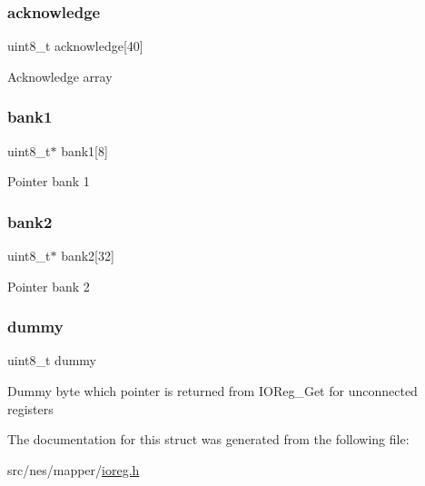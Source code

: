 \subsubsection{\texorpdfstring{acknowledge}{acknowledge}}
{\footnotesize\ttfamily uint8\+\_\+t acknowledge\mbox{[}40\mbox{]}}

Acknowledge array \mbox{\label{struct_i_o_reg_a3a254f17251e937f76932c5081eab405}} 
\subsubsection{\texorpdfstring{bank1}{bank1}}
{\footnotesize\ttfamily uint8\+\_\+t$\ast$ bank1\mbox{[}8\mbox{]}}

Pointer bank 1 \mbox{\label{struct_i_o_reg_ae4edb3d07789e7300d9f7ff80927814a}} 
\subsubsection{\texorpdfstring{bank2}{bank2}}
{\footnotesize\ttfamily uint8\+\_\+t$\ast$ bank2\mbox{[}32\mbox{]}}

Pointer bank 2 \mbox{\label{struct_i_o_reg_aff7b59f569ec689a7580bd6911daafd5}} 
\subsubsection{\texorpdfstring{dummy}{dummy}}
{\footnotesize\ttfamily uint8\+\_\+t dummy}

Dummy byte which pointer is returned from I\+O\+Reg\+\_\+\+Get for unconnected registers 

The documentation for this struct was generated from the following file\+:\begin{DoxyCompactItemize}
\item 
src/nes/mapper/\hyperlink{ioreg_8h}{ioreg.\+h}\end{DoxyCompactItemize}
